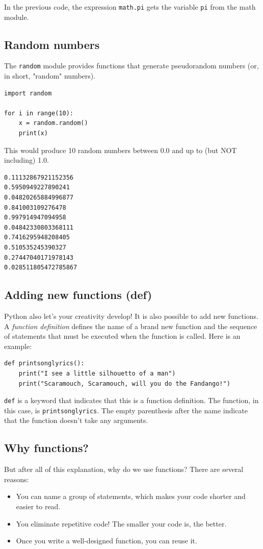 In the previous code, the expression \texttt{math.pi} gets the variable \texttt{pi} from the math module.

\subsection{Random numbers}
The \texttt{random} module provides functions that generate pseudorandom numbers (or, in short, "random" numbers).
\begin{verbatim}
import random

for i in range(10):
    x = random.random()
    print(x)
\end{verbatim}
This would produce 10 random numbers between 0.0 and up to (but NOT including) 1.0.
\begin{verbatim}
0.11132867921152356
0.5950949227890241
0.04820265884996877
0.841003109276478
0.997914947094958
0.04842330803368111
0.7416295948208405
0.510535245390327
0.27447040171978143
0.028511805472785867
\end{verbatim}

\subsection{Adding new functions (def)}
Python also let's your creativity develop! It is also possible to add new functions. A \textit{function definition} defines the name of a brand new function and the sequence of statements that must be executed when the function is called. Here is an example:
\begin{verbatim}
def printsonglyrics():
    print("I see a little silhouetto of a man")
    print("Scaramouch, Scaramouch, will you do the Fandango!")
\end{verbatim}
\texttt{def} is a keyword that indicates that this is a function definition. The function, in this case, is \texttt{printsonglyrics}. The empty parenthesis after the name indicate that the function doesn't take any arguments. 

\subsection{Why functions?}
But after all of this explanation, why do we use functions? There are several reasons:
\begin{itemize}
    \item You can name a group of statements, which makes your code shorter and easier to read.
    \item You eliminate repetitive code! The smaller your code is, the better.
    \item Once you write a well-designed function, you can reuse it.
\end{itemize}

